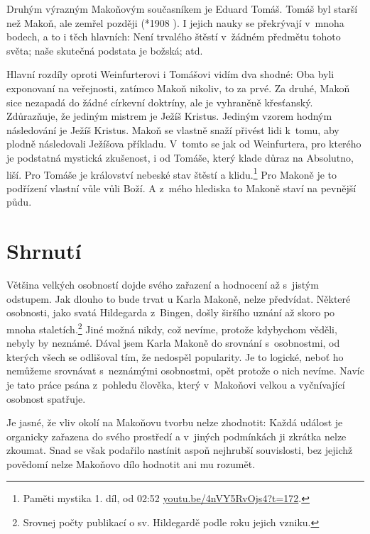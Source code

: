 Druhým výrazným Makoňovým současníkem je Eduard Tomáš. Tomáš byl starší než
Makoň, ale zemřel později (*1908 ). I jejich nauky se překrývají
v~mnoha bodech, a to i těch hlavních: Není trvalého štěstí v~žádném předmětu
tohoto světa; naše skutečná podstata je božská; atd.

Hlavní rozdíly oproti Weinfurterovi i Tomášovi vidím dva shodné: Oba byli
exponovaní na veřejnosti, zatímco Makoň nikoliv, to za prvé. Za druhé, Makoň
sice nezapadá do žádné církevní doktríny, ale je vyhraněně křesťanský.
Zdůrazňuje, že jediným mistrem je Ježíš Kristus. Jediným vzorem hodným
následování je Ježíš Kristus. Makoň se vlastně snaží přivést lidi k~tomu, aby
plodně následovali Ježíšova příkladu. V~tomto se jak od Weinfurtera, pro kterého
je podstatná mystická zkušenost, i od Tomáše, který klade důraz na Absolutno,
liší. Pro Tomáše je království nebeské stav štěstí a klidu.\footnote{Paměti
mystika 1. díl, od 02:52 \href{https://youtu.be/4nVY5RvOjs4?t=172}{youtu.be/4nVY5RvOjs4?t=172}.} Pro Makoně je to
podřízení vlastní vůle vůli Boží. A z~mého hlediska to Makoně staví na pevnější
půdu.

\section{Shrnutí}

Většina velkých osobností dojde svého zařazení a hodnocení až s~jistým odstupem.
Jak dlouho to bude trvat u Karla Makoně, nelze předvídat. Některé osobnosti,
jako svatá Hildegarda z~Bingen, došly širšího uznání až skoro po mnoha
staletích.\footnote{Srovnej počty publikací o sv. Hildegardě podle roku jejich
vzniku.} Jiné možná nikdy, což nevíme, protože kdybychom věděli, nebyly by
neznámé. Dával jsem Karla Makoně do srovnání s~osobnostmi, od kterých všech se
odlišoval tím, že nedospěl popularity. Je to logické, neboť ho nemůžeme
srovnávat s~neznámými osobnostmi, opět protože o nich nevíme. Navíc je tato
práce psána z~pohledu člověka, který v~Makoňovi velkou a vyčnívající osobnost
spatřuje.

Je jasné, že vliv okolí na Makoňovu tvorbu nelze zhodnotit: Každá událost je
organicky zařazena do svého prostředí a v~jiných podmínkách ji zkrátka nelze
zkoumat. Snad se však podařilo nastínit aspoň nejhrubší souvislosti, bez jejichž
povědomí nelze Makoňovo dílo hodnotit ani mu rozumět.
